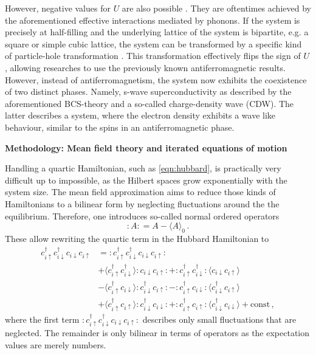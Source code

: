 \documentclass[20pt]{article}
\newcommand{\msection}[1]{ { \vspace{5mm} \hspace{-6mm} \large \textbf{#1}} \vspace{2mm} } %
\newcommand{\expec}[1]{\langle #1 \rangle}
\begin{document}
However, negative values for $U$ are also possible \cite{sentef}. They are oftentimes achieved by the aforementioned effective interactions mediated by phonons.
If the system is precisely at half-filling and the underlying lattice of the system is bipartite, e.g. a square or simple cubic lattice, 
the system can be transformed by a specific kind of particle-hole transformation \cite{micnas90}.
This transformation effectively flips the sign of $U$, allowing researches to use the previously known antiferromagnetic results.
However, instead of antiferromagnetism, the system now exhibits the coexistence of two distinct phases.
Namely, s-wave superconductivity as described by the aforementioned BCS-theory and a so-called charge-density wave (CDW).
The latter describes a system, where the electron density exhibits a wave like behaviour, similar to the spins in an antiferromagnetic phase.


\msection{Methodology: Mean field theory and iterated equations of motion}

Handling a quartic Hamiltonian, such as \autoref{eqn:hubbard}, is practically very difficult up to impossible,
as the Hilbert spaces grow exponentially with the system size.
The mean field approximation aims to reduce those kinds of Hamiltonians to a bilinear form by neglecting fluctuations around the the equilibrium.
Therefore, one introduces so-called normal ordered operators
\begin{equation}
    :A: = A - \expec{A}_0\,.
\end{equation}
These allow rewriting the quartic term in the Hubbard Hamiltonian to
\begin{subequations}
\begin{align}
    c_{i\uparrow}^\dagger c_{i\downarrow}^\dagger c_{i\downarrow} c_{i\uparrow} &= :c_{i\uparrow}^\dagger c_{i\downarrow}^\dagger c_{i\downarrow} c_{i\uparrow}:\\
        &+\expec{c_{i\uparrow}^\dagger c_{i\downarrow}^\dagger} :c_{i\downarrow} c_{i\uparrow}: 
            + :c_{i\uparrow}^\dagger c_{i\downarrow}^\dagger: \expec{c_{i\downarrow} c_{i\uparrow}} \\
        &-\expec{c_{i\uparrow}^\dagger c_{i\downarrow}} :c_{i\downarrow}^\dagger c_{i\uparrow}: 
            - :c_{i\uparrow}^\dagger c_{i\downarrow}: \expec{c_{i\downarrow}^\dagger c_{i\uparrow}} \\
        &+\expec{c_{i\uparrow}^\dagger c_{i\uparrow}} :c_{i\downarrow}^\dagger c_{i\downarrow}: 
            + :c_{i\uparrow}^\dagger c_{i\uparrow}: \expec{c_{i\downarrow}^\dagger c_{i\downarrow}} + \text{const}\,,
\end{align}
\end{subequations}
where the first term $:c_{i\uparrow}^\dagger c_{i\downarrow}^\dagger c_{i\downarrow} c_{i\uparrow}:$ describes only small fluctuations that are neglected.
The remainder is only bilinear in terms of operators as the expectation values are merely numbers.
\end{document}
